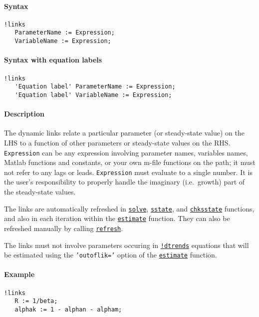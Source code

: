 


	\paragraph{Syntax}

\begin{verbatim}
!links
   ParameterName := Expression;
   VariableName := Expression;
\end{verbatim}

\paragraph{Syntax with equation
labels}

\begin{verbatim}
!links
   'Equation label' ParameterName := Expression;
   'Equation label' VariableName := Expression;
\end{verbatim}

\paragraph{Description}

The dynamic links relate a particular parameter (or steady-state value)
on the LHS to a function of other parameters or steady-state values on
the RHS. \texttt{Expression} can be any expression involving parameter
names, variables names, Matlab functions and constants, or your own
m-file functions on the path; it must not refer to any lags or leads.
\texttt{Expression} must evaluate to a single number. It is the user's
responsibility to properly handle the imaginary (i.e.~growth) part of
the steady-state values.

The links are automatically refreshed in
\href{model/solve}{\texttt{solve}},
\href{model/sstate}{\texttt{sstate}}, and
\href{model/chksstate}{\texttt{chksstate}} functions, and also in each
iteration within the \href{model/estimate}{\texttt{estimate}} function.
They can also be refreshed manually by calling
\href{model/refresh}{\texttt{refresh}}.

The links must not involve parameters occuring in
\href{modellang/dtrends}{\texttt{!dtrends}} equations that will be
estimated using the \texttt{'outoflik='} option of the
\href{model/estimate}{\texttt{estimate}} function.

\paragraph{Example}

\begin{verbatim}
!links
   R := 1/beta;
   alphak := 1 - alphan - alpham;
\end{verbatim}


